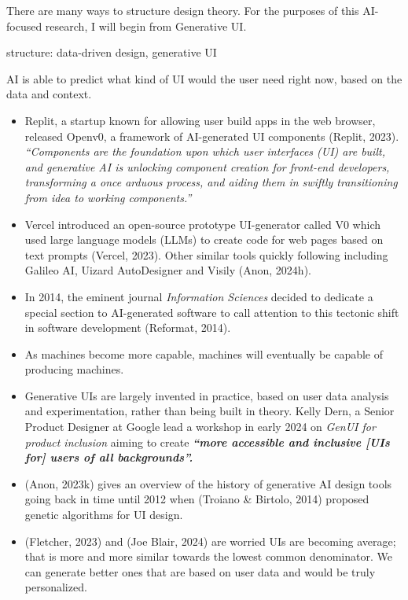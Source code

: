 \documentclass[
  letterpaper,
  DIV=11,
  numbers=noendperiod]{scrartcl}
\begin{document}
There are many ways to structure design theory. For the purposes of this
AI-focused research, I will begin from Generative UI.

structure: data-driven design, generative UI

AI is able to predict what kind of UI would the user need right now,
based on the data and context.

\begin{itemize}
\item
  Replit, a startup known for allowing user build apps in the web
  browser, released Openv0, a framework of AI-generated UI components
  (Replit, 2023). \emph{``Components are the foundation upon which user
  interfaces (UI) are built, and generative AI is unlocking component
  creation for front-end developers, transforming a once arduous
  process, and aiding them in swiftly transitioning from idea to working
  components.''}
\item
  Vercel introduced an open-source prototype UI-generator called V0
  which used large language models (LLMs) to create code for web pages
  based on text prompts (Vercel, 2023). Other similar tools quickly
  following including Galileo AI, Uizard AutoDesigner and Visily (Anon,
  2024h).
\item
  In 2014, the eminent journal \emph{Information Sciences} decided to
  dedicate a special section to AI-generated software to call attention
  to this tectonic shift in software development (Reformat, 2014).
\item
  As machines become more capable, machines will eventually be capable
  of producing machines.
\item
  Generative UIs are largely invented in practice, based on user data
  analysis and experimentation, rather than being built in theory. Kelly
  Dern, a Senior Product Designer at Google lead a workshop in early
  2024 on \emph{GenUI for product inclusion} aiming to create
  \textbf{\emph{``\textbf{more accessible and inclusive {[}UIs for{]}
  users of all backgrounds}''.}}
\item
  (Anon, 2023k) gives an overview of the history of generative AI design
  tools going back in time until 2012 when (Troiano \& Birtolo, 2014)
  proposed genetic algorithms for UI design.
\item
  (Fletcher, 2023) and (Joe Blair, 2024) are worried UIs are becoming
  average; that is more and more similar towards the lowest common
  denominator. We can generate better ones that are based on user data
  and would be truly personalized.

\end{itemize}
\end{document}
